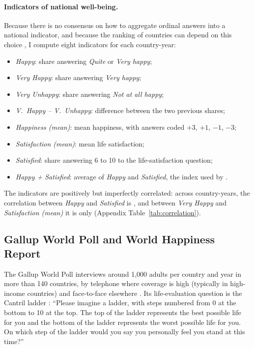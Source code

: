 \documentclass[12pt]{article}
\begin{document}
\paragraph{Indicators of national well-being.}
Because there is no consensus on how to aggregate ordinal answers into a national indicator, and because the ranking of countries can depend on this choice \citep{bond_sad_2019}, I compute eight indicators for each country-year:
\begin{itemize}
    \item \textit{Happy}: share answering \textit{Quite} or \textit{Very happy};
    \item \textit{Very Happy}: share answering \textit{Very happy};
    \item \textit{Very Unhappy}: share answering \textit{Not at all happy};
    \item \textit{V.~Happy -- V.~Unhappy}: difference between the two previous shares;
    \item \textit{Happiness (mean)}: mean happiness, with answers coded $+3$, $+1$, $-1$, $-3$;
    \item \textit{Satisfaction (mean)}: mean life satisfaction;
    \item \textit{Satisfied}: share answering 6 to 10 to the life-satisfaction question;
    \item \textit{Happy + Satisfied}: average of \textit{Happy} and \textit{Satisfied}, the index used by \citet{inglehart_genes_2000}.
\end{itemize}
The indicators are positively but imperfectly correlated: across country-years, the correlation between \textit{Happy} and \textit{Satisfied} is \corHappySatisfied, and between \textit{Very Happy} and \textit{Satisfaction (mean)} it is only \corVeryHappySatisfiedMean (Appendix Table~\ref{tab:correlation}).
\fi

\subsection{Gallup World Poll and World Happiness Report}\label{subsec:gallup}

The Gallup World Poll interviews around 1,000 adults per country and year in more than 140 countries, by telephone where coverage is high (typically in high-income countries) and face-to-face elsewhere \citep{gallup_methodology_2022}. Its life-evaluation question is the Cantril ladder \citep{cantril_pattern_1965}: ``Please imagine a ladder, with steps numbered from 0 at the bottom to 10 at the top. The top of the ladder represents the best possible life for you and the bottom of the ladder represents the worst possible life for you. On which step of the ladder would you say you personally feel you stand at this time?''
\end{document}
